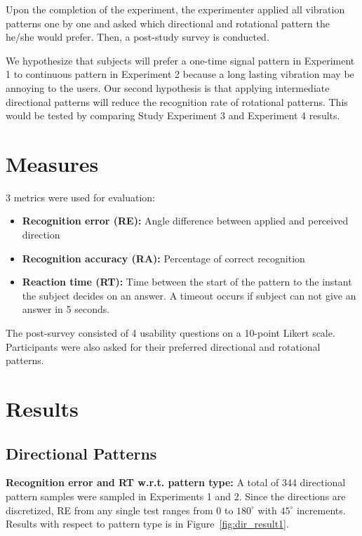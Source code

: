 Upon the completion of the experiment, the experimenter applied all vibration patterns one by one and asked which directional and rotational pattern the he/she would prefer. Then, a post-study survey is conducted.

We hypothesize that subjects will prefer a one-time signal pattern in Experiment 1 to continuous pattern in Experiment 2 because a long lasting vibration may be annoying to the users. Our second hypothesis is that applying intermediate directional patterns will reduce the recognition rate of rotational patterns. This would be tested by comparing Study Experiment 3 and Experiment 4 results.

\section{Measures}

3 metrics were used for evaluation:
\begin{itemize}
\item{\textbf{Recognition error (RE):} Angle difference between applied and perceived direction}
\item{\textbf{Recognition accuracy (RA):} Percentage of correct recognition}
\item{\textbf{Reaction time (RT):}  Time between the start of the pattern to the instant the subject decides on an answer. A timeout occurs if subject can not give an answer in 5 seconds.}
\end{itemize}

The post-survey consisted of 4 usability questions on a 10-point Likert scale. Participants were also asked for their preferred directional and rotational patterns.

\section{Results}
\subsection{Directional Patterns}

\textbf{Recognition error and RT w.r.t. pattern type:} A total of 344 directional pattern samples were sampled in Experiments 1 and 2. Since the directions are discretized, RE from any single test ranges from 0 to $180^{\circ}$ with $45^{\circ}$ increments. Results with respect to pattern type is in Figure~\ref{fig:dir_result1}. 


